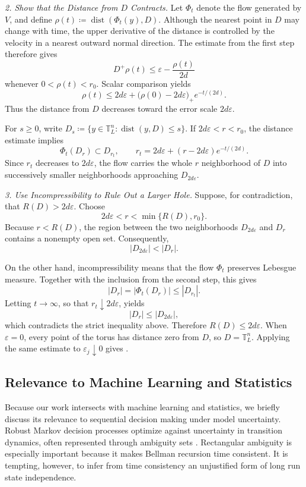 \documentclass[11pt,reqno,noamsfonts]{amsart}
\theoremstyle{definition}
\theoremstyle{remark}
\newcommand{\T}{\mathbb T}
\newcommand{\dist}{\operatorname{dist}}
\newcommand{\Dplus}{D^+}
\begin{document}
\textit{2. Show that the Distance from $D$ Contracts.}
Let $\Phi_t$ denote the flow generated by $V$, and define $\rho(t)\coloneqq\dist(\Phi_t(y),D)$. 
Although the nearest point in $D$ may change with time, the upper
derivative of the distance is controlled by the velocity in a nearest
outward normal direction. The estimate from the first step therefore
gives
\[
  \Dplus\rho(t)
  \le
  \varepsilon-\frac{\rho(t)}{2d}
\]
whenever $0<\rho(t)<r_0$. Scalar comparison yields
\[
  \rho(t)
  \le
  2d\varepsilon+
  \bigl(\rho(0)-2d\varepsilon\bigr)_+
  e^{-t/(2d)}.
\]
Thus the distance from $D$ decreases toward the error scale
$2d\varepsilon$.

For $s\ge0$, write
  $D_s\coloneqq
  \{y\in\T_L^n:\dist(y,D)\le s\}$.
If
  $2d\varepsilon<r<r_0$,
the distance estimate implies
\[
  \Phi_t(D_r)\subset D_{r_t},
  \qquad
  r_t
  =
  2d\varepsilon+
  (r-2d\varepsilon)e^{-t/(2d)}.
\]
Since $r_t$ decreases to $2d\varepsilon$, the flow carries the whole
$r$ neighborhood of $D$ into successively smaller neighborhoods
approaching $D_{2d\varepsilon}$.

\textit{3. Use Incompressibility to Rule Out a Larger Hole.}
Suppose, for contradiction, that
  $R(D)>2d\varepsilon$.
Choose
\[
  2d\varepsilon
  <
  r
  <
  \min\{R(D),r_0\}.
\]
Because $r<R(D)$, the region between the two neighborhoods
$D_{2d\varepsilon}$ and $D_r$ contains a nonempty open set. Consequently,
\[
  |D_{2d\varepsilon}|<|D_r|.
\]

On the other hand, incompressibility means that the flow $\Phi_t$
preserves Lebesgue measure. Together with the inclusion from the
second step, this gives
\[
  |D_r|
  =
  |\Phi_t(D_r)|
  \le
  |D_{r_t}|.
\]
Letting $t\to\infty$, so that $r_t\downarrow2d\varepsilon$, yields
\[
  |D_r|
  \le
  |D_{2d\varepsilon}|,
\]
which contradicts the strict inequality above. Therefore
  $R(D)\le2d\varepsilon$.
When $\varepsilon=0$, every point of the torus has distance zero from
$D$, so $D=\T_L^n$. Applying the same estimate to
$\varepsilon_j\downarrow0$ gives
.


\subsection{Relevance to Machine Learning and Statistics}

Because our work intersects with machine learning and statistics, we
briefly discuss its relevance to sequential decision making under model
uncertainty. Robust Markov decision processes optimize against
uncertainty in transition dynamics, often represented through ambiguity
sets \cite{Iyengar2005,NilimElGhaoui2005,WiesemannKuhnRustem2013}.
Rectangular ambiguity is especially important because it makes Bellman
recursion time consistent. It is tempting, however, to infer from time
consistency an unjustified form of long run state independence.
\end{document}
